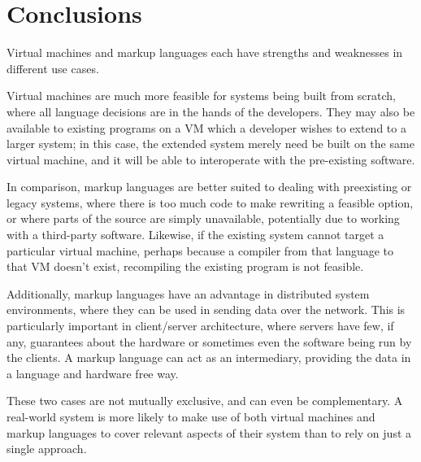 \documentclass{sig-alternate}
\begin{document}
\section{Conclusions}


Virtual machines and markup languages each have strengths and weaknesses in different use cases.

Virtual machines are much more feasible for systems being built from scratch, where all language decisions are in the hands of the developers. They may also be available to existing programs on a VM which a developer wishes to extend to a larger system; in this case, the extended system merely need be built on the same virtual machine, and it will be able to interoperate with the pre-existing software.

In comparison, markup languages are better suited to dealing with preexisting or legacy systems, where there is too much code to make rewriting a feasible option, or where parts of the source are simply unavailable, potentially due to working with a third-party software. Likewise, if the existing system cannot target a particular virtual machine, perhaps because a compiler from that language to that VM doesn't exist, recompiling the existing program is not feasible.

Additionally, markup languages have an advantage in distributed system environments, where they can be used in sending data over the network. This is particularly important in client/server architecture, where servers have few, if any, guarantees about the hardware or sometimes even the software being run by the clients. A markup language can act as an intermediary, providing the data in a language and hardware free way.


These two cases are not mutually exclusive, and can even be complementary. A real-world system is more likely to make use of both virtual machines and markup languages to cover relevant aspects of their system than to rely on just a single approach.










  
\end{document}
